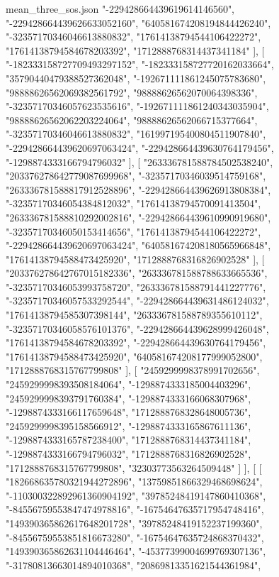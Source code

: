 \begin{filecontents*}[overwrite]{mean_three_sos.json}
    "-229428664439619614146560",
    "-229428664439626633052160",
    "640581674208194844426240",
    "-32357170346046613880832",
    "17614138794544106422272",
    "17614138794584678203392",
    "1712888768314437341184"
   ],
   [
    "-182333158727709493297152",
    "-182333158727720162033664",
    "35790440479388527362048",
    "-192671111861245075783680",
    "98888626562069382561792",
    "98888626562070064398336",
    "-32357170346057623535616",
    "-192671111861240343035904",
    "98888626562062203224064",
    "98888626562066715377664",
    "-32357170346046613880832",
    "161997195400804511907840",
    "-229428664439620697063424",
    "-229428664439630764179456",
    "-1298874333166794796032"
   ],
   [
    "263336781588784502538240",
    "203376278642779087699968",
    "-32357170346039514759168",
    "263336781588817912528896",
    "-229428664439626913808384",
    "-32357170346054384812032",
    "17614138794570091413504",
    "263336781588810292002816",
    "-229428664439610990919680",
    "-32357170346050153414656",
    "17614138794544106422272",
    "-229428664439620697063424",
    "640581674208180565966848",
    "17614138794588473425920",
    "1712888768316826902528"
   ],
   [
    "203376278642767015182336",
    "263336781588788633665536",
    "-32357170346053993758720",
    "263336781588791441227776",
    "-32357170346057533292544",
    "-229428664439631486124032",
    "17614138794585307398144",
    "263336781588789355610112",
    "-32357170346058576101376",
    "-229428664439628999426048",
    "17614138794584678203392",
    "-229428664439630764179456",
    "17614138794588473425920",
    "640581674208177999052800",
    "1712888768315767799808"
   ],
   [
    "2459299998378991702656",
    "2459299998393508184064",
    "-1298874333185004403296",
    "2459299998393791760384",
    "-1298874333166068307968",
    "-1298874333166117659648",
    "1712888768328648005736",
    "2459299998395158566912",
    "-1298874333165867611136",
    "-1298874333165787238400",
    "1712888768314437341184",
    "-1298874333166794796032",
    "1712888768316826902528",
    "1712888768315767799808",
    "32303773563264509448"
   ]
  ],
  [
   [
    "182668635780321944272896",
    "13759851866329468698624",
    "-110300322892961360904192",
    "39785248419147860410368",
    "-84556759553847474978816",
    "-16754647635717954748416",
    "149390365862617648201728",
    "39785248419152237199360",
    "-84556759553851816673280",
    "-16754647635724868370432",
    "149390365862631104446464",
    "-45377399004699769307136",
    "-31780813663014894010368",
    "20869813351621544361984",

\end{filecontents*}

